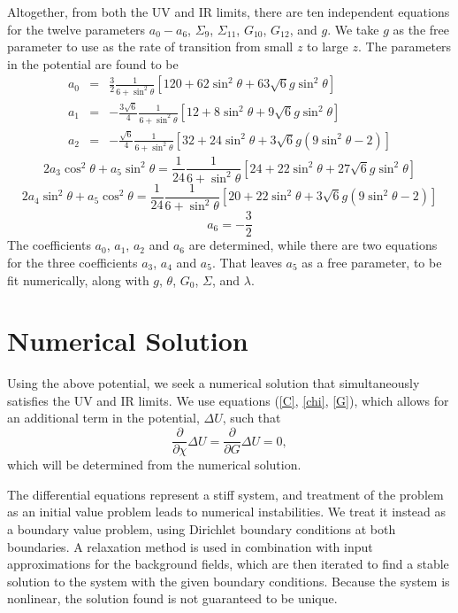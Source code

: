 \documentclass[aps,prd,12pt,nofootinbib]{revtex4}
\newcommand{\be}{\begin{equation}}
\newcommand{\ee}{\end{equation}}
\newcommand{\ba}{\begin{eqnarray}}
\newcommand{\ea}{\end{eqnarray}}
\def\rt6{\sqrt{6}}
\begin{document}
Altogether, from both the UV and IR limits, there are ten independent equations for the twelve parameters $a_0 - a_6$, $\Sigma_9$, $\Sigma_{11}$, $G_{10}$, $G_{12}$, and $g$.  
We take $g$ as the free parameter to use as the rate of transition from small $z$ to large $z$.  
The parameters in the potential are found to be
\ba
a_0 &=&  \frac{3}{2} \frac{1}{6 + \sin^2 \theta}\left[ 120 + 62 \sin^2 \theta + 63 \rt6 g \sin^2 \theta \right] \\
a_1 &=&  -\frac{3\rt6}{4} \frac{1}{6 + \sin^2 \theta}\left[ 12 + 8 \sin^2 \theta + 9 \rt6 g \sin^2 \theta \right] \\
a_2 &=&  -\frac{\rt6}{4} \frac{1}{6 + \sin^2 \theta}\left[ 32 + 24 \sin^2 \theta + 3 \rt6 g(9 \sin^2 \theta - 2) \right]
\ea
\be
2 a_3 \cos^2 \theta + a_5 \sin^2 \theta = \frac{1}{24} \frac{1}{6 + \sin^2 \theta}\left[ 24 + 22 \sin^2 \theta + 27 \rt6 g \sin^2 \theta \right] 
\ee
\be
2 a_4 \sin^2 \theta + a_5 \cos^2 \theta = \frac{1}{24} \frac{1}{6 + \sin^2 \theta}\left[ 20 +22 \sin^2 \theta   +  3 \rt6 g (9 \sin^2 \theta -2) \right]
\ee
\be
a_6 = -\frac{3}{2}
\ee
The coefficients $a_0$, $a_1$, $a_2$ and $a_6$ are determined, while there are two equations for the three coefficients $a_3$, $a_4$ and $a_5$.  
That leaves $a_5$ as a free parameter, to be fit numerically, along with $g$, $\theta$, $G_0$, $\Sigma$, and $\lambda$.

\section{Numerical Solution}

Using the above potential, we seek a numerical solution that simultaneously satisfies the UV and IR limits. 
We use equations (\ref{C}, \ref{chi}, \ref{G}), which allows for an additional term in the potential, $\Delta U$, such that 
\be
\frac{\partial }{\partial \chi} \Delta U = \frac{\partial }{\partial G}\Delta U = 0,
\ee
which will be determined from the numerical solution.

The differential equations represent a stiff system, and treatment of the problem as an initial value problem leads to numerical instabilities. 
We treat it instead as a boundary value problem, using Dirichlet boundary conditions at both boundaries. 
A relaxation method is used in combination with input approximations for the background fields, which are then iterated to find a stable solution to the system with the given boundary conditions. 
Because the system is nonlinear, the solution found is not guaranteed to be unique.
\end{document}
